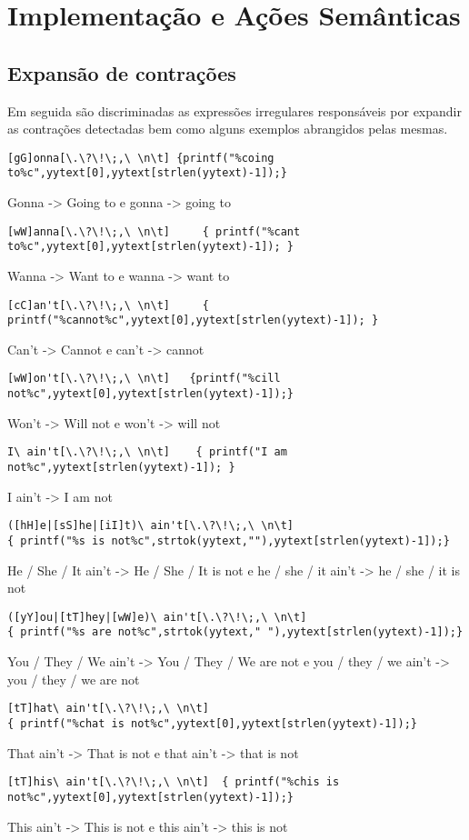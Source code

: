 \documentclass{report}
\begin{document}
\chapter{Implementação e Ações Semânticas} \label{ae}
\section{Expansão de contrações}
Em seguida são discriminadas as expressões irregulares responsáveis por expandir as contrações detectadas bem como alguns exemplos abrangidos pelas mesmas.
\\
\begin{verbatim}
[gG]onna[\.\?\!\;,\ \n\t] {printf("%coing to%c",yytext[0],yytext[strlen(yytext)-1]);}
\end{verbatim}
Gonna -> Going to      e 	gonna -> going to
\\
\begin{verbatim}
[wW]anna[\.\?\!\;,\ \n\t]     { printf("%cant to%c",yytext[0],yytext[strlen(yytext)-1]); }
\end{verbatim}
Wanna -> Want to    e     wanna -> want to
\\
\begin{verbatim}
[cC]an't[\.\?\!\;,\ \n\t]     { printf("%cannot%c",yytext[0],yytext[strlen(yytext)-1]); }
\end{verbatim}
Can't -> Cannot    e     can't -> cannot
\\
\begin{verbatim}
[wW]on't[\.\?\!\;,\ \n\t]   {printf("%cill not%c",yytext[0],yytext[strlen(yytext)-1]);}
\end{verbatim}
Won't -> Will not    e     won't -> will not
\\
\begin{verbatim}
I\ ain't[\.\?\!\;,\ \n\t]    { printf("I am not%c",yytext[strlen(yytext)-1]); }
\end{verbatim}
I ain't -> I am not
\\
\begin{verbatim}
([hH]e|[sS]he|[iI]t)\ ain't[\.\?\!\;,\ \n\t]
{ printf("%s is not%c",strtok(yytext,""),yytext[strlen(yytext)-1]);}
\end{verbatim}
He / She / It ain't -> He / She / It is not
e
he / she / it ain't -> he / she / it is not
\\
\begin{verbatim}
([yY]ou|[tT]hey|[wW]e)\ ain't[\.\?\!\;,\ \n\t]
{ printf("%s are not%c",strtok(yytext," "),yytext[strlen(yytext)-1]);}
\end{verbatim}
You / They / We ain't -> You / They / We are not
e
you / they / we ain't -> you / they / we are not
\\
\begin{verbatim}
[tT]hat\ ain't[\.\?\!\;,\ \n\t]
{ printf("%chat is not%c",yytext[0],yytext[strlen(yytext)-1]);}
\end{verbatim}
That ain't -> That is not
e
that ain't -> that is not
\\
\begin{verbatim}
[tT]his\ ain't[\.\?\!\;,\ \n\t]  { printf("%chis is not%c",yytext[0],yytext[strlen(yytext)-1]);}
\end{verbatim}
This ain't -> This is not
e
this ain't -> this is not
\end{document}
